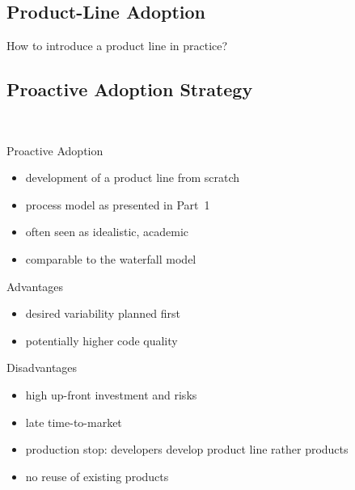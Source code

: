 \subsection{Product-Line Adoption}
\begin{frame}{\myframetitle}
	\Huge\centering How to introduce a product line in practice?
\end{frame}

\subsection{Proactive Adoption Strategy}
\begin{frame}{\myframetitle\ }
	\begin{fancycolumns}[animation=none]
		\begin{definition}{Proactive Adoption}
			\begin{itemize}
				\item development of a product line from scratch
				\item process model as presented in Part~1
				\item often seen as idealistic, academic
				\item comparable to the waterfall model
			\end{itemize}
		\end{definition}
	\nextcolumn
		\begin{note}{Advantages}
			\begin{itemize}
				\item desired variability planned first
				\item potentially higher code quality
			\end{itemize}
		\end{note}
		\begin{note}{Disadvantages}
			\begin{itemize}
				\item high up-front investment and risks
				\item late time-to-market
				\item production stop: developers develop product line rather products
				\item no reuse of existing products
			\end{itemize}
		\end{note}
	\end{fancycolumns}
\end{frame}

